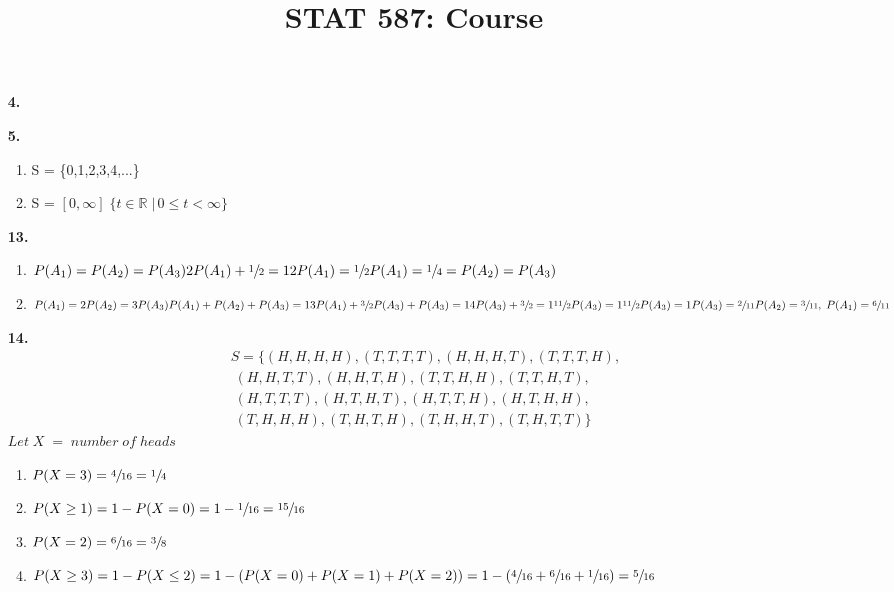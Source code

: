 \documentclass{article}
\title{STAT 587: Course \exerciseset}
\author{\studentname}
\begin{document}
\maketitle

\begin{enumerate}
\item[\textbf{4.}] 
\item[\textbf{5.}]
    \begin{enumerate}
        \item S = \{0,1,2,3,4,...\}
        \item S = \( [0,\infty] \;  \{ t \in \mathbb{R}\; |\,0 \leq t < \infty\}  \)
    \end{enumerate}
\item[\textbf{13.}]
\begin{enumerate}
        \item \(P(A_1)  = P(A_2) = P(A_3)\\ 
                2P(A_1) + \sfrac{1}{2} = 1\\
                2P(A_1) = \sfrac{1}{2}\\
                P(A_1) = \sfrac{1}{4} = P(A_2) = P(A_3)
                \)
        \item \( P(A_1) = 2P(A_2) = 3P(A_3)\\
                P(A_1) + P(A_2) + P(A_3) = 1\\
                3P(A_1) + \sfrac{3}{2}P(A_3) + P(A_3) = 1\\
                4P(A_3) + \sfrac{3}{2} = 1\\
                \sfrac{11}{2}P(A_3) =1\\
                \sfrac{11}{2}P(A_3) = 1\\
                P(A_3) = \sfrac{2}{11}\\
               P(A_2) = \sfrac{3}{11} ,\; P(A_1) = \sfrac{6}{11}\)
    \end{enumerate}
\item[\textbf{14.}] \begin{align*} S = 
                            \{ (H,H,H,H), (T,T,T,T), (H,H,H,T), (T,T,T,H),\\
                            \;(H,H,T,T), (H,H,T,H), (T,T,H,H), (T,T,H,T),\\
                            \;(H,T,T,T), (H,T,H,T), (H,T,T,H), (H,T,H,H),\\
                            \;(T,H,H,H), (T,H,T,H), (T,H,H,T), (T,H,T,T) \} \end{align*}
\(Let\;X\;= \; number \; of \; heads\)
\begin{enumerate}
    \item \(P(X=3) = \sfrac{4}{16} = \sfrac{1}{4} \)
    \item \(P(X\geq 1) = 1-P(X = 0) = 1 - \sfrac{1}{16} = \sfrac{15}{16}\)
    \item \(P(X = 2) = \sfrac{6}{16} = \sfrac{3}{8} \)
    \item \(P(X\geq 3) = 1-P(X\leq2) = 1 - (P(X=0) + P(X=1) + P(X=2)) = 1 - (\sfrac{4}{16} + \sfrac{6}{16} + \sfrac{1}{16}) = \sfrac{5}{16}\)
    
\end{enumerate}                            
\end{enumerate}
\end{document}
